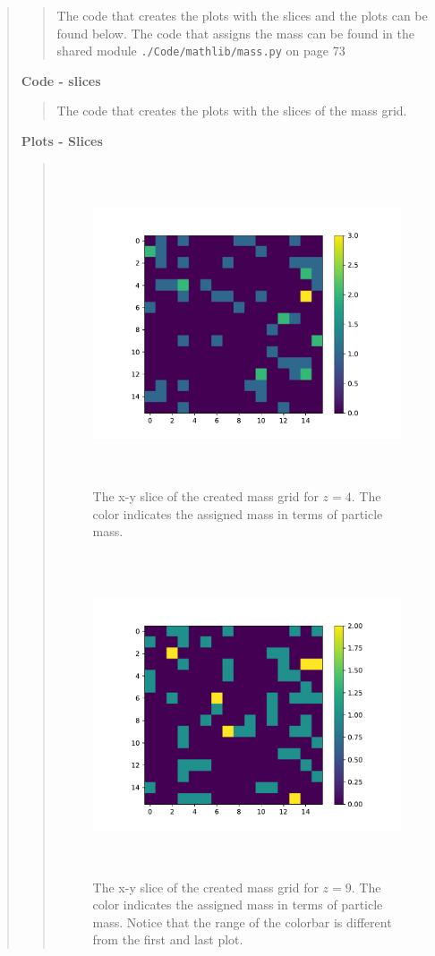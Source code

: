 \begin{quote}
\begin{quote}
The code that creates the plots with the slices and the plots can be found below. The code that assigns the mass can be found in the shared module \texttt{./Code/mathlib/mass.py} on page 73
\end{quote}

\textbf{Code - slices}
\begin{quote}
The code that creates the plots with the slices of the mass grid.

\end{quote}

\newpage

\textbf{Plots - Slices}
\begin{quote}
\begin{figure}[!ht]
\centering
\includegraphics[width=14cm, height=9.5cm]{./Plots/5a_slice_4.pdf}
\caption{The x-y slice of the created mass grid for $z = 4$. The color indicates the assigned mass in terms of particle mass. }
\end{figure}


\begin{figure}[!ht]
\centering
\includegraphics[width=14cm, height=9.5cm]{./Plots/5a_slice_9.pdf}
\caption{The x-y slice of the created mass grid for $z = 9$. The color indicates the assigned mass in terms of particle mass. Notice that the range of the colorbar is different from the first and last plot.}
\end{figure}
\newpage


\end{quote}
\end{quote}
